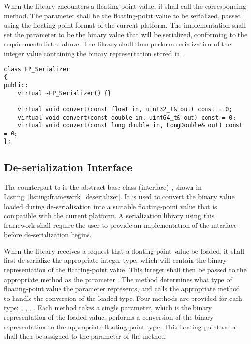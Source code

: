 When the library encounters a floating-point value, it shall call the corresponding  method. The parameter  shall be the floating-point value to be serialized, passed using the floating-point format of the current platform. The implementation shall set the parameter  to be the binary value that will be serialized, conforming to the requirements listed above. The library shall then perform serialization of the integer value containing the binary representation stored in .

\noindent
\begin{minipage}{\linewidth}
\begin{singlespace}
\begin{lstlisting}[caption=The \code{FP\_Serializer} interface., label=listing:framework_serializer]
class FP_Serializer
{
public:
    virtual ~FP_Serializer() {}
    
    virtual void convert(const float in, uint32_t& out) const = 0;
    virtual void convert(const double in, uint64_t& out) const = 0;
    virtual void convert(const long double in, LongDouble& out) const = 0;
};
\end{lstlisting}
\end{singlespace}
\end{minipage}

\subsection{De-serialization Interface}
The counterpart to  is the abstract base class (interface) , shown in Listing~\ref{listing:framework_deserializer}. It is used to convert the binary value loaded during de-serialization into a suitable floating-point value that is compatible with the current platform. A serialization library using this framework shall require the user to provide an implementation of the  interface before de-serialization begins.

When the library receives a request that a floating-point value be loaded, it shall first de-serialize the appropriate integer type, which will contain the binary representation of the floating-point value. This integer shall then be passed to the appropriate  method as the parameter . The  method determines what type of floating-point value the  parameter represents, and calls the appropriate method to handle the conversion of the loaded type. Four methods are provided for each type: , , , . Each method takes a single parameter, which is the binary representation of the loaded value, performs a conversion of the binary representation to the appropriate floating-point type. This floating-point value shall then be assigned to the  parameter of the  method.

